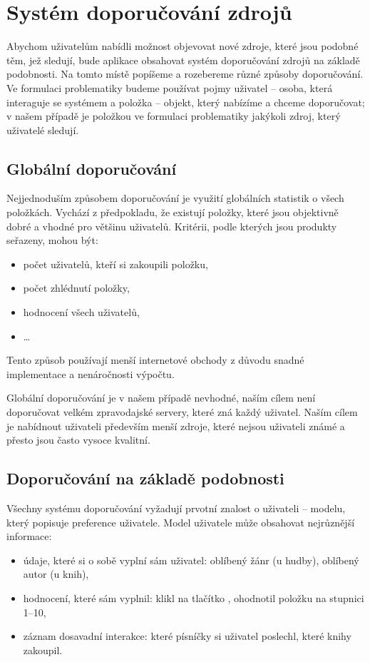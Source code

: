 \chapter{Systém doporučování zdrojů}

Abychom uživatelům nabídli možnost objevovat nové zdroje, které jsou podobné těm, jež sledují, bude aplikace obsahovat systém doporučování zdrojů na základě podobnosti.
Na tomto místě popíšeme a rozebereme různé způsoby doporučování.
Ve formulaci problematiky budeme používat pojmy uživatel -- osoba, která interaguje se systémem a položka -- objekt, který nabízíme a chceme doporučovat; v našem případě je položkou ve formulaci problematiky jakýkoli zdroj, který uživatelé sledují.

\section{Globální doporučování}

Nejjednoduším způsobem doporučování je využití globálních statistik o všech položkách.
Vychází z předpokladu, že existují položky, které jsou objektivně dobré a vhodné pro většinu uživatelů.
Kritérii, podle kterých jsou produkty seřazeny, mohou být:
\begin{itemize}
    \item počet uživatelů, kteří si zakoupili položku,
    \item počet zhlédnutí položky,
    \item hodnocení všech uživatelů,
    \item \ldots
\end{itemize}
Tento způsob používají menší internetové obchody z důvodu snadné implementace a nenáročnosti výpočtu.

Globální doporučování je v našem případě nevhodné, naším cílem není doporučovat velkém zpravodajské servery, které zná každý uživatel.
Naším cílem je nabídnout uživateli především menší zdroje, které nejsou uživateli známé a přesto jsou často vysoce kvalitní.

\section{Doporučování na základě podobnosti}

Všechny systému doporučování vyžadují prvotní znalost o uživateli -- modelu, který popisuje preference uživatele.
Model uživatele může obsahovat nejrůznější informace:
\begin{itemize}
    \item údaje, které si o sobě vyplní sám uživatel: oblíbený žánr (u hudby), oblíbený autor (u knih),
    \item hodnocení, které sám vyplnil: klikl na tlačítko , ohodnotil položku na stupnici 1--10,
    \item záznam dosavadní interakce: které písníčky si uživatel poslechl, které knihy zakoupil.
\end{itemize}

